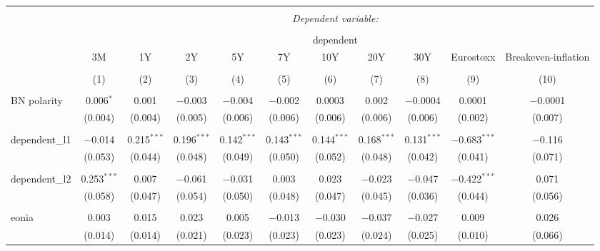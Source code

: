 
\begin{table}[!htbp] \centering 
  \caption{} 
  \label{} 
\begin{adjustbox}{width=1.35\textwidth}
\begin{tabular}{@{\extracolsep{5pt}}lcccccccccc} 
\\[-1.8ex]\hline 
\hline \\[-1.8ex] 
 & \multicolumn{10}{c}{\textit{Dependent variable:}} \\ 
\cline{2-11} 
\\[-1.8ex] & \multicolumn{10}{c}{dependent} \\ 
 & 3M & 1Y & 2Y & 5Y & 7Y & 10Y & 20Y & 30Y & Eurostoxx & Breakeven-inflation \\ 
\\[-1.8ex] & (1) & (2) & (3) & (4) & (5) & (6) & (7) & (8) & (9) & (10)\\ 
\hline \\[-1.8ex] 
 BN polarity & 0.006$^{*}$ & 0.001 & $-$0.003 & $-$0.004 & $-$0.002 & 0.0003 & 0.002 & $-$0.0004 & 0.0001 & $-$0.0001 \\ 
  & (0.004) & (0.004) & (0.005) & (0.006) & (0.006) & (0.006) & (0.006) & (0.006) & (0.002) & (0.007) \\ 
  & & & & & & & & & & \\ 
 dependent\_l1 & $-$0.014 & 0.215$^{***}$ & 0.196$^{***}$ & 0.142$^{***}$ & 0.143$^{***}$ & 0.144$^{***}$ & 0.168$^{***}$ & 0.131$^{***}$ & $-$0.683$^{***}$ & $-$0.116 \\ 
  & (0.053) & (0.044) & (0.048) & (0.049) & (0.050) & (0.052) & (0.048) & (0.042) & (0.041) & (0.071) \\ 
  & & & & & & & & & & \\ 
 dependent\_l2 & 0.253$^{***}$ & 0.007 & $-$0.061 & $-$0.031 & 0.003 & 0.023 & $-$0.023 & $-$0.047 & $-$0.422$^{***}$ & 0.071 \\ 
  & (0.058) & (0.047) & (0.054) & (0.050) & (0.048) & (0.047) & (0.045) & (0.036) & (0.044) & (0.056) \\ 
  & & & & & & & & & & \\ 
 eonia & 0.003 & 0.015 & 0.023 & 0.005 & $-$0.013 & $-$0.030 & $-$0.037 & $-$0.027 & 0.009 & 0.026 \\ 
  & (0.014) & (0.014) & (0.021) & (0.023) & (0.023) & (0.023) & (0.024) & (0.025) & (0.010) & (0.066) \\ 

\end{tabular}
\end{adjustbox}
\end{table}
